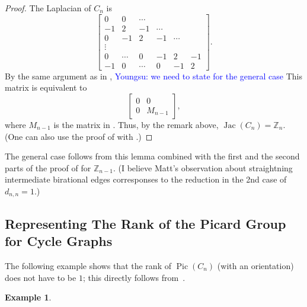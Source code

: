 \documentclass[11pt,reqno]{amsart}
\DeclareMathOperator{\Pic}{Pic}
\DeclareMathOperator{\Jac}{Jac}
\newcommand{\youngsu}[1]{{\textcolor{blue}{Youngsu: #1}}}
\theoremstyle{definition}
\newtheorem{myeg}[mydef]{Example}
\theoremstyle{plain}
\begin{document}
		\begin{proof}
			The Laplacian of $C_n$ is 
			\begin{equation}
			\begin{bmatrix}
				0 & 0 & \cdots \\
				-1 & 2 & -1 & \cdots \\
				0 & -1 & 2 & -1 & \cdots \\
				\vdots \\
				0 &  \cdots& 0 & -1 & 2 & -1 \\
				-1 &  0 & \cdots & 0 &  -1 & 2 
			\end{bmatrix}. 
			\end{equation}
			By the same argument as in , 
			\youngsu{we need to state \Cref{obj2} for the general case}
			This matrix is equivalent to 
			\begin{equation}
				\left[ \begin{array}{c|c}
					0 & 0 \\
					\hline 
					0 & M_{n-1}
				\end{array} \right],
			\end{equation}
			where $M_{n-1}$ is the matrix in .
			Thus, by the remark above, $\Jac (C_n) = \mathbb{Z}_n$. 
			(One can also use the proof of  with .)
		\end{proof}

		The general case follows from this lemma combined with the first and the second parts of the proof of  for $\mathbb{Z}_{n-1}$. (I believe Matt's observation about straightning intermediate birational edges corresponses to the reduction in the 2nd case of $d_{n,n}=1$.)

	\subsection{Representing The Rank of the Picard Group for Cycle Graphs}
		The following example shows that the rank of $\Pic(C_n)$ (with an orientation) does not have to be $1$;
		this directly follows from~\cite[Corollary 3.5]{wagner2000critical}.

		\begin{myeg}
		\end{myeg}
\end{document}

